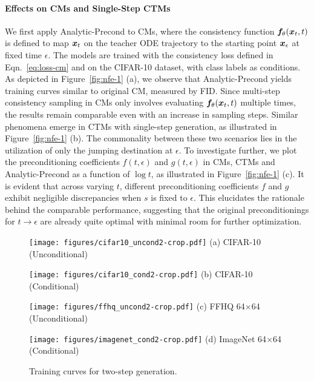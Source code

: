 \paragraph{Effects on CMs and Single-Step CTMs} We first apply Analytic-Precond to CMs, where the consistency function $\bm{f}_\theta(\bm{x}_t,t)$ is defined to map $\bm{x}_t$ on the teacher ODE trajectory to the starting point $\bm{x}_\epsilon$ at fixed time $\epsilon$. The models are trained with the consistency loss defined in Eqn.~\eqref{eq:loss-cm} and on the CIFAR-10 dataset, with class labels as conditions. As depicted in Figure~\ref{fig:nfe-1} (a), we observe that Analytic-Precond yields training curves similar to original CM, measured by FID. Since multi-step consistency sampling in CMs only involves evaluating $\bm{f}_\theta(\bm{x}_t,t)$ multiple times, the results remain comparable even with an increase in sampling steps. Similar phenomena emerge in CTMs with single-step generation, as illustrated in Figure~\ref{fig:nfe-1} (b). The commonality between these two scenarios lies in the utilization of only the jumping destination at $\epsilon$. To investigate further, we plot the preconditioning coefficients $f(t,\epsilon)$ and $g(t,\epsilon)$ in CMs, CTMs and Analytic-Precond as a function of $\log t$, as illustrated in Figure~\ref{fig:nfe-1} (c). It is evident that across varying $t$, different preconditioning coefficients $f$ and $g$ exhibit negligible discrepancies when $s$ is fixed to $\epsilon$. This elucidates the rationale behind the comparable performance, suggesting that the original preconditionings for $t\rightarrow\epsilon$ are already quite optimal with minimal room for further optimization.
\begin{figure}[t]
    \centering
	\begin{minipage}[t]{.24\linewidth}
		\centering
		\texttt{[image: figures/cifar10\_uncond2-crop.pdf]}
		\small{(a) CIFAR-10 (Unconditional)}
	\end{minipage}
	\begin{minipage}[t]{.24\linewidth}
		\centering
		\texttt{[image: figures/cifar10\_cond2-crop.pdf]}
		\small{(b) CIFAR-10 (Conditional)}
	\end{minipage}
    \begin{minipage}[t]{.24\linewidth}
		\centering
		\texttt{[image: figures/ffhq\_uncond2-crop.pdf]}
		\small{(c) FFHQ 64$\times$64 (Unconditional)}
	\end{minipage}
	\begin{minipage}[t]{.24\linewidth}
		\centering
		\texttt{[image: figures/imagenet\_cond2-crop.pdf]}
		\small{(d) ImageNet 64$\times$64 (Conditional)}
	\end{minipage}
	\caption{\label{fig:nfe-2} Training curves for two-step generation.}
	\vspace{-.1in}
\end{figure}

